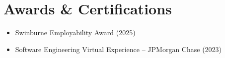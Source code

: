\documentclass[letterpaper,11pt]{article}
\newcommand{\resumeSubHeadingListStartBullets}{\begin{itemize}[leftmargin=*]}
\newcommand{\resumeSubHeadingListEnd}{\end{itemize}}
\begin{document}
\section{Awards \& Certifications}
  \resumeSubHeadingListStartBullets
      \item\small{Swinburne Employability Award (2025)} \vspace{-2pt}
      \item\small{Software Engineering Virtual Experience -- JPMorgan Chase (2023)} \vspace{-2pt}
  \resumeSubHeadingListEnd
\end{document}
